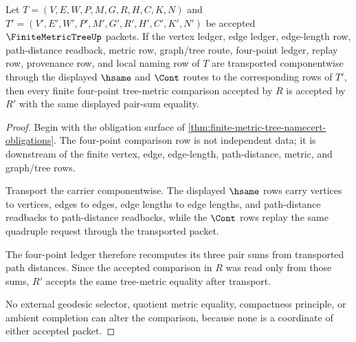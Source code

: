 \begin{theorem}
\label{thm:finite-metric-tree-four-point-stability}
Let $T=(V,E,W,P,M,G,R,H,C,K,N)$ and $T'=(V',E',W',P',M',G',R',H',C',K',N')$ be accepted $\FiniteMetricTreeUp$ packets. If the vertex ledger, edge ledger, edge-length row, path-distance readback, metric row, graph/tree route, four-point ledger, replay row, provenance row, and local naming row of $T$ are transported componentwise through the displayed $\hsame$ and $\Cont$ routes to the corresponding rows of $T'$, then every finite four-point tree-metric comparison accepted by $R$ is accepted by $R'$ with the same displayed pair-sum equality.
\end{theorem}
\begin{proof}
Begin with the obligation surface of \autoref{thm:finite-metric-tree-namecert-obligations}. The four-point comparison row is not independent data; it is downstream of the finite vertex, edge, edge-length, path-distance, metric, and graph/tree rows.

Transport the carrier componentwise. The displayed $\hsame$ rows carry vertices to vertices, edges to edges, edge lengths to edge lengths, and path-distance readbacks to path-distance readbacks, while the $\Cont$ rows replay the same quadruple request through the transported packet.

The four-point ledger therefore recomputes its three pair sums from transported path distances. Since the accepted comparison in $R$ was read only from those sums, $R'$ accepts the same tree-metric equality after transport.

No external geodesic selector, quotient metric equality, compactness principle, or ambient completion can alter the comparison, because none is a coordinate of either accepted packet.
\end{proof}



